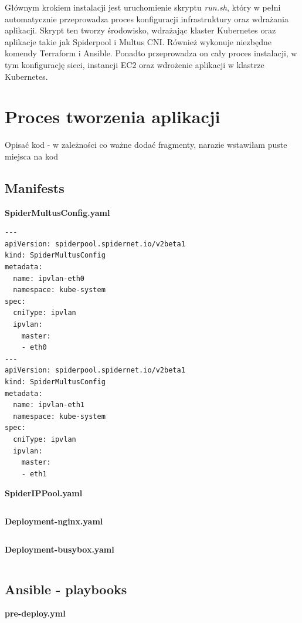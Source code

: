 \documentclass[onecolumn,12pt]{article}
\begin{document}
Głównym krokiem instalacji jest uruchomienie skryptu \textit{run.sh}, który w pełni automatycznie przeprowadza proces konfiguracji infrastruktury oraz wdrażania aplikacji. Skrypt ten tworzy środowisko, wdrażając klaster Kubernetes oraz aplikacje takie jak Spiderpool i Multus CNI. Również wykonuje niezbędne komendy Terraform i Ansible. Ponadto przeprowadza on cały proces instalacji, w tym konfigurację sieci, instancji EC2 oraz wdrożenie aplikacji w klastrze Kubernetes.

\section{Proces tworzenia aplikacji}
Opisać kod - w zależności co ważne dodać fragmenty, narazie wstawiłam puste miejsca na kod

\subsection{Manifests}

\textbf{SpiderMultusConfig.yaml}
\begin{lstlisting}[style=yaml]
---
apiVersion: spiderpool.spidernet.io/v2beta1
kind: SpiderMultusConfig
metadata:
  name: ipvlan-eth0
  namespace: kube-system
spec:
  cniType: ipvlan
  ipvlan:
    master:
    - eth0
---
apiVersion: spiderpool.spidernet.io/v2beta1
kind: SpiderMultusConfig
metadata:
  name: ipvlan-eth1
  namespace: kube-system
spec:
  cniType: ipvlan
  ipvlan:
    master:
    - eth1
\end{lstlisting}

\textbf{SpiderIPPool.yaml}
\begin{lstlisting}[style=yaml]
\end{lstlisting}


\textbf{Deployment-nginx.yaml}
\begin{lstlisting}[style=yaml]
\end{lstlisting}


\textbf{Deployment-busybox.yaml}
\begin{lstlisting}[style=yaml]
\end{lstlisting}


\subsection{Ansible - playbooks}

\textbf{pre-deploy.yml}
\begin{lstlisting}[style=yaml]
\end{lstlisting}
\end{document}
